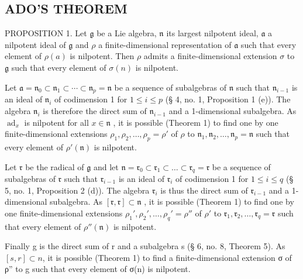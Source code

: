 \subsection{ADO'S THEOREM}

PROPOSITION 1. Let \(\mathfrak{g}\) be a Lie algebra, \(\mathfrak{n}\) its largest nilpotent ideal, \(\mathfrak{a}\) a nilpotent ideal of \(\mathfrak{g}\) and \(\rho\) a finite-dimensional representation of \(\mathfrak{a}\) such that every element of \(\rho(a)\) is nilpotent. Then \(\rho\) admits a finite-dimensional extension \(\sigma\) to \(\mathfrak{g}\) such that every element of \(\sigma(n)\) is nilpotent.

Let \(\mathfrak{a} = \mathfrak{n}_0 \subset \mathfrak{n}_1 \subset \cdots \subset \mathfrak{n}_p = \mathfrak{n}\) be a sequence of subalgebras of \(\mathfrak{n}\) such that \(\mathfrak{n}_{i-1}\) is an ideal of \(\mathfrak{n}_i\) of codimension 1 for \(1 \leqslant i \leqslant p\) (§ 4, no. 1, Proposition 1 (e)). The algebra \(\mathfrak{n}_i\) is therefore the direct sum of \(\mathfrak{n}_{i-1}\) and a 1-dimensional subalgebra. As \(\operatorname{ad}_x\) is nilpotent for all \(x \in \mathfrak{n}\) , it is possible (Theorem 1) to find one by one finite-dimensional extensions \(\rho_1, \rho_2, \ldots, \rho_p = \rho'\) of \(\rho\) to \(\mathfrak{n}_1, \mathfrak{n}_2, \ldots, \mathfrak{n}_p = \mathfrak{n}\) such that every element of \(\rho'(\mathfrak{n})\) is nilpotent.

Let \(\mathfrak{r}\) be the radical of \(\mathfrak{g}\) and let \(\mathfrak{n} = \mathfrak{r}_0 \subset \mathfrak{r}_1 \subset \dots \subset \mathfrak{r}_q = \mathfrak{r}\) be a sequence of subalgebras of \(\mathfrak{r}\) such that \(\mathfrak{r}_{i-1}\) is an ideal of \(\mathfrak{r}_i\) of codimension 1 for \(1 \leqslant i \leqslant q\) (§ 5, no. 1, Proposition 2 (d)). The algebra \(\mathfrak{r}_i\) is thus the direct sum of \(\mathfrak{r}_{i-1}\) and a 1-dimensional subalgebra. As \([\mathfrak{r}, \mathfrak{r}] \subset \mathfrak{n}\) , it is possible (Theorem 1) to find one by one finite-dimensional extensions \(\rho_1', \rho_2', \ldots, \rho_q' = \rho''\) of \(\rho'\) to \(\mathfrak{r}_1, \mathfrak{r}_2, \ldots, \mathfrak{r}_q = \mathfrak{r}\) such that every element of \(\rho''(\mathfrak{n})\) is nilpotent.

Finally g is the direct sum of r and a subalgebra s (§ 6, no. 8, Theorem 5). As \([s, r] \subset n\), it is possible (Theorem 1) to find a finite-dimensional extension σ of ρ'' to g such that every element of σ(n) is nilpotent.

